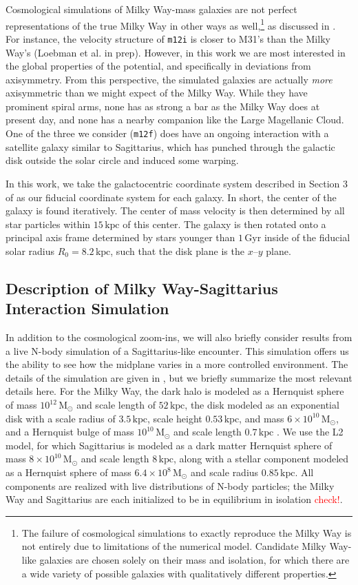 \documentclass[twocolumn]{aastex62}
\newcommand{\Gus}[1]{\textcolor{red}{#1}}
\newcommand{\Msun}{\ensuremath{\text{M}_\odot}}
\newcommand{\kpc}{\text{kpc}}
\newcommand{\Gyr}{\text{Gyr}}
\newcommand{\mi}{\texttt{m12i}}
\newcommand{\mf}{\texttt{m12f}}
\begin{document}
Cosmological simulations of Milky Way-mass galaxies are not perfect
representations of the true Milky Way in other ways as well,\footnote{The
failure of cosmological simulations to exactly reproduce the Milky Way is not
entirely due to limitations of the numerical model. Candidate Milky Way-like
galaxies are chosen solely on their mass and isolation, for which there are a
wide variety of possible galaxies with qualitatively different properties.} as
discussed in \citet{2018arXiv180610564S}. For instance, the velocity structure
of \mi{} is closer to M31's than the Milky Way's (Loebman et al. in prep).
However, in this work we are most interested in the global properties of the
potential, and specifically in deviations from axisymmetry. From this
perspective, the simulated galaxies are actually \emph{more} axisymmetric than
we might expect of the Milky Way. While they have prominent spiral arms, none
has as strong a bar as the Milky Way does at present day, and none has a
nearby companion like the Large Magellanic Cloud. One of the three we consider
(\mf) does have an ongoing interaction with a satellite galaxy similar to
Sagittarius, which has punched through the galactic disk outside the solar
circle and induced some warping.

In this work, we take the galactocentric coordinate system described in
Section 3 of \citet{2018arXiv180610564S} as our fiducial coordinate system for
each galaxy. In short, the center of the galaxy is found iteratively. The
center of mass velocity is then determined by all star particles within
$15\,\kpc$ of this center. The galaxy is then rotated onto a principal axis
frame determined by stars younger than $1\,\Gyr$ inside of the fiducial solar
radius $R_{0} = 8.2\,\kpc$, such that the disk plane is the $x$--$y$ plane.

\subsection{Description of Milky Way-Sagittarius Interaction Simulation} 
\label{ssec:sag_sim}
In addition to the cosmological zoom-ins, we will also briefly consider
results from a live N-body simulation of a Sagittarius-like encounter. This
simulation offers us the ability to see how the midplane varies in a more
controlled environment. The details of the simulation are given in
\citet{2018MNRAS.481..286L}, but we briefly summarize the most relevant
details here. For the Milky Way, the dark halo is modeled as a Hernquist
sphere of mass $10^{12}\,\Msun$ and scale length of $52\,\kpc$, the disk
modeled as an exponential disk with a scale radius of $3.5\,\kpc$, scale
height $0.53\,\kpc$, and mass $6\times10^{10}\,\Msun$, and a Hernquist bulge
of mass $10^{10}\,\Msun$ and scale length $0.7\,\kpc$
\citep{1990ApJ...356..359H}. We use the L2 model, for which Sagittarius is
modeled as a dark matter Hernquist sphere of mass $8\times10^{10}\,\Msun$ and
scale length $8\,\kpc$, along with a stellar component modeled as a Hernquist
sphere of mass $6.4\times10^8\,\Msun$ and scale radius $0.85\,\kpc$. All
components are realized with live distributions of N-body particles; the Milky
Way and Sagittarius are each initialized to be in equilibrium in isolation
\Gus{check!}.
\end{document}
